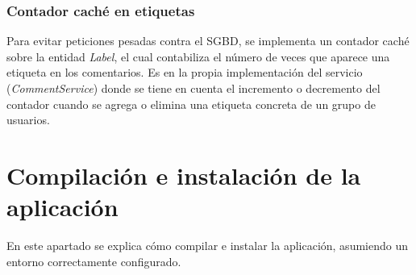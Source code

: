 \documentclass{article}
\begin{document}
\subsubsection{Contador caché en etiquetas}

	Para evitar peticiones pesadas contra el SGBD, se implementa un contador caché sobre la entidad \emph{Label}, el cual contabiliza el número de veces que aparece una etiqueta en los comentarios. Es en la propia implementación del servicio (\emph{CommentService}) donde se tiene en cuenta el incremento o decremento del contador cuando se agrega o elimina una etiqueta concreta de un grupo de usuarios.

\section{Compilación e instalación de la aplicación}

	En este apartado se explica cómo compilar e instalar la aplicación, asumiendo un entorno correctamente configurado.
	
\end{document}

